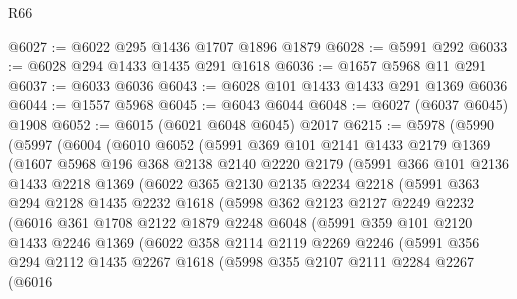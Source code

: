 \begin{lexlean}{R66}
\begin{coremodule}
@6027 := @6022 @295 @1436 @1707 @1896 @1879
@6028 := @5991 @292
@6033 := @6028 @294 @1433 @1435 @291 @1618
@6036 := @1657 @5968 @11 @291
@6037 := @6033 @6036
@6043 := @6028 @101 @1433 @1433 @291 @1369 @6036
@6044 := @1557 @5968
@6045 := @6043 @6044
@6048 := @6027 (@6037 @6045) @1908
@6052 := @6015 (@6021 @6048 @6045) @2017
@6215 := @5978
    (@5990
      (@5997
        (@6004
          (@6010
            @6052
            (@5991
              @369
              @101
              @2141
              @1433
              @2179
              @1369
              (@1607
                @5968
                @196
                @368
                @2138
                @2140
                @2220
                @2179
                (@5991
                  @366
                  @101
                  @2136
                  @1433
                  @2218
                  @1369
                  (@6022
                    @365
                    @2130
                    @2135
                    @2234
                    @2218
                    (@5991
                      @363
                      @294
                      @2128
                      @1435
                      @2232
                      @1618
                      (@5998
                        @362
                        @2123
                        @2127
                        @2249
                        @2232
                        (@6016
                          @361
                          @1708
                          @2122
                          @1879
                          @2248
                          @6048
                          (@5991
                            @359
                            @101
                            @2120
                            @1433
                            @2246
                            @1369
                            (@6022
                              @358
                              @2114
                              @2119
                              @2269
                              @2246
                              (@5991
                                @356
                                @294
                                @2112
                                @1435
                                @2267
                                @1618
                                (@5998
                                  @355
                                  @2107
                                  @2111
                                  @2284
                                  @2267
                                  (@6016

\end{coremodule}
\end{lexlean}
